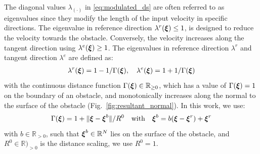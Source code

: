 The diagonal values $\lambda_{(\cdot)}$ in \eqref{eq:modulated_ds} are often referred to as eigenvalues since they modify the length of the input velocity in specific directions. 
The eigenvalue in reference direction $\lambda^r(\boldsymbol{\xi}) \leq 1$, is designed to reduce the velocity towards the obstacle.  
Conversely, the velocity increases along the tangent direction using $\lambda^e(\boldsymbol{\xi}) \geq 1$. The eigenvalues in reference direction $\lambda^r$ and tangent direction $\lambda^e$ are defined as:
\begin{equation}
\begin{split}
    \lambda^r(\boldsymbol{\xi}) = 1 - 1 /\Gamma(\boldsymbol{\xi}) , \quad \lambda^e(\boldsymbol{\xi}) = 1 + 1 / \Gamma(\boldsymbol{\xi})
    \label{eq:eigenvalues}
    \end{split}
\end{equation}
with the continuous distance function $\Gamma(\boldsymbol{\xi}) \in \mathbb{R}_{\geq 0}$, which has a value of $\Gamma(\boldsymbol{\xi}) = 1$ on the boundary of an obstacle, and monotonically increases along the normal to the surface of the obstacle (Fig.~\ref{fig:resultant_normal}). In this work, we use:
\begin{equation}
  \Gamma(\boldsymbol{\xi}) = 1 + \| \boldsymbol{\xi} - \boldsymbol{\xi}^b \|  / R^0
  \quad \text{with} \quad
  \boldsymbol{\xi}^b = b (\boldsymbol{\xi} - \boldsymbol{\xi}^r) + \boldsymbol{\xi}^r
  \label{eq:distance_function}
\end{equation}
with $b \in \mathbb{R}_{>0}$, such that $\boldsymbol{\xi}^b \in \mathbb{R}^N$ lies on the surface of the obstacle, and $R^0 \in \mathbb{R})_{>0}$ is the distance scaling, we use $R^0 = 1$.

